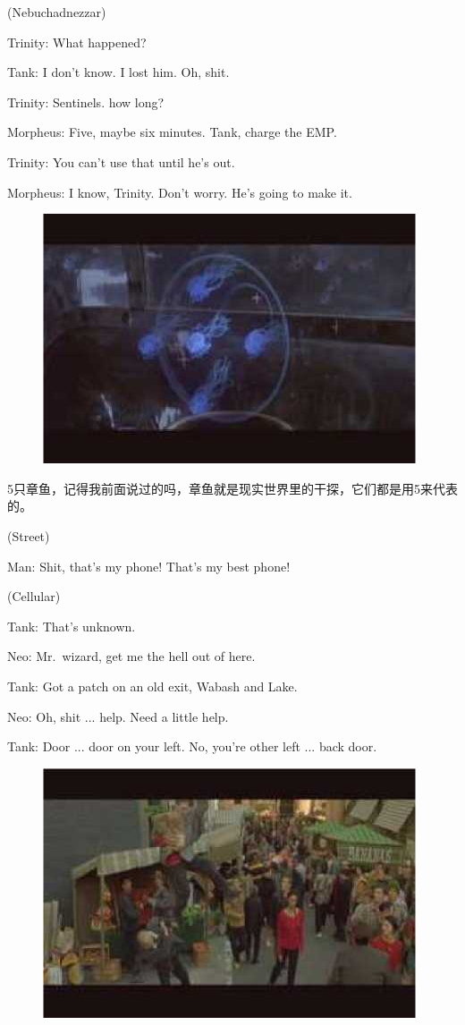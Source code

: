 \documentclass{ctexart}
\newenvironment{myquote}{\color{green} \setlength{\leftskip}{6em} \setlength{\rightskip}{4em} \setlength{\parindent}{-2em}}{\par}
\begin{document}
\begin{myquote}
(Nebuchadnezzar)

Trinity: What happened?

Tank: I don't know. I lost him. Oh, shit.

Trinity: Sentinels. how long?

Morpheus: Five, maybe six minutes. Tank, charge the EMP.

Trinity: You can't use that until he's out.

Morpheus: I know, Trinity. Don't worry. He's going to make it.
\end{myquote}

\begin{figure}[htb]
\centering
\includegraphics[width=0.5\linewidth]{fig/read_Matrix-77}
\end{figure}

5只章鱼，记得我前面说过的吗，章鱼就是现实世界里的干探，它们都是用5来代表的。

\begin{myquote}
(Street)

Man: Shit, that's my phone! That's my best phone!

(Cellular)

Tank: That's unknown.

Neo: Mr.~wizard, get me the hell out of here.

Tank: Got a patch on an old exit, Wabash and Lake.

Neo: Oh, shit ... help. Need a little help.

Tank: Door ... door on your left. No, you're other left ... back door.
\end{myquote}

\begin{figure}[htb]
\centering
\includegraphics[width=0.5\linewidth]{fig/read_Matrix-78}
\end{figure}
\end{document}
